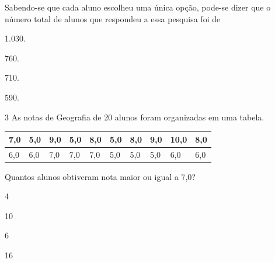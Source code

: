 Sabendo-se que cada aluno escolheu uma única opção, pode-se dizer que o
número total de alunos que respondeu a essa pesquisa foi de

\begin{escolha}
\item
  1.030.
\item
  760.
\item
  710.
\item
  590.
\end{escolha}

\num{3} As notas de Geografia de 20 alunos foram organizadas em uma tabela.

\begin{longtable}[]{@{}llllllllll@{}}
\toprule
7,0 & 5,0 & 9,0 & 5,0 & 8,0 & 5,0 & 8,0 & 9,0 & 10,0 &
8,0\tabularnewline
\midrule
\endhead
6,0 & 6,0 & 7,0 & 7,0 & 7,0 & 5,0 & 5,0 & 5,0 & 6,0 & 6,0\tabularnewline
\bottomrule
\end{longtable}

Quantos alunos obtiveram nota maior ou igual a 7,0?

\begin{multicols}{2}
\begin{escolha}
\item
  4
\item
  10
\item
  6
\item
  16
\end{escolha}
\end{multicols}
